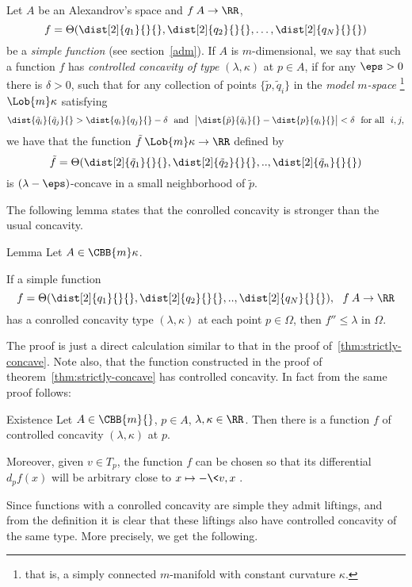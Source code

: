 Let $A$ be an Alexandrov's space and $f\:A\to \RR$,
$$f=\Theta(\dist[2]{q_1}{}{},\dist[2]{q_2}{}{},\dots,\dist[2]{q_N}{}{})$$ be a \emph{simple
function} (see section~\ref{adm}).
If $A$ is $m$-dimensional, we say that such a function $f$ has \emph{controlled
concavity of type} $(\lambda,\kappa)$ at $p\in A$, if for any $\eps>0$ there is
$\delta>0$, such that for any collection of points $\{\tilde p,\tilde q_i\}$ in
the \emph{model $m$-space}%
\footnote{that is, a simply connected $m$-manifold with
constant curvature $\kappa$.} $\Lob{m}\kappa$  satisfying 
\[\dist{\tilde q_i}{\tilde q_j}{}
>
\dist{q_i}{q_j}{}-\delta
\ \ \text{and}\ \  
\bigl|\dist{\tilde
p}{\tilde q_i}{}-\dist{p}{q_i}{}\bigr|<\delta
\ \ \text{for all}\ \ i,j,\] 
we have that the function 
$\tilde f\:\Lob{m}\kappa\to \RR$ defined by 
$$\tilde f=\Theta(\dist[2]{\tilde q_1}{}{},\dist[2]{\tilde q_2}{}{},..,\dist[2]{\tilde
q_n}{}{})$$
is $(\lambda-\eps)$-concave in a small neighborhood of $\tilde p$.

The following lemma states that the conrolled concavity is stronger than the usual
concavity.

\begin{thm}{Lemma} \label{contr-concave}
Let $A\in\CBB{m}\kappa$.

If a simple function 
$$f=\Theta(\dist[2]{q_1}{}{},\dist[2]{q_2}{}{},..,\dist[2]{q_N}{}{}),\ \ f\:A\to\RR$$ 
has a conrolled concavity type $(\lambda,\kappa)$ at each point $p\in \Omega$, then
$f''\le \lambda$ in $\Omega$. 
\end{thm}

The proof is just a direct calculation similar to that in the proof
of~\ref{thm:strictly-concave}. 
Note also, that the function constructed in the proof of
theorem~\ref{thm:strictly-concave} has controlled concavity.
In fact from the
same proof follows:

\begin{thm}{Existence} \label{exist-control}
Let $A\in\CBB{m}{}$, $p\in A$, $\lambda,\kappa\in\RR$.
Then there is a function $f$ of controlled concavity $(\lambda,\kappa)$
at $p$.

Moreover, given $v\in T_p$, the function $f$ can be chosen so that its differential $d_p f(x)$ will be arbitrary close to $x\mapsto -\<v,x\>$.
\end{thm}

Since functions with a conrolled concavity are simple they admit liftings, and
from the definition it is clear that these liftings also have controlled
concavity of the same type.
More precisely, we get the following.


